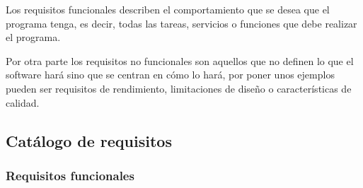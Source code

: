 
Los requisitos funcionales describen el comportamiento que se desea que el programa tenga, es decir, todas las tareas, servicios o funciones que debe realizar el programa.\cite{malan_functional_2001}

Por otra parte los requisitos no funcionales son aquellos que no definen lo que el software hará sino que se centran en cómo lo hará, por poner unos ejemplos pueden ser requisitos de rendimiento, limitaciones de diseño o características de calidad.\cite{chung2000non} 

\subsection{Catálogo de requisitos}

\subsubsection{Requisitos funcionales}

